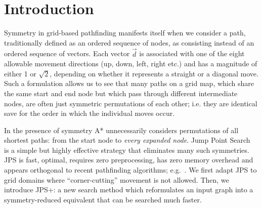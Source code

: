 \section{Introduction}
\label{sec:introduction}

Symmetry in grid-based pathfinding manifests itself when we consider a
path, traditionally defined as an ordered sequence of nodes, as consisting
instead of an ordered sequence of vectors.
Each vector $\vec{d}$ is associated with 
one of the eight allowable movement directions (up, down, left, right etc.)
and has a magnitude of either 1 or $\sqrt 2$, depending on whether 
it represents a straight or a diagonal move.
Such a formulation allows us to see that 
many paths on a grid map, which share the same start and end node but which pass through 
different intermediate nodes, are often just symmetric permutations of each other; i.e.
they are identical save for the order in which the individual moves occur.

In the presence of symmetry A* unnecessarily considers permutations 
of all shortest paths: from the start node to 
\emph{every expanded node}.
Jump Point Search~\cite{harabor11b} is a simple but highly effective strategy that
eliminates many such symmetries. 
JPS is fast, optimal, requires zero preprocessing, has zero memory overhead
and appears orthogonal to recent pathfinding algorithms; e.g.~\cite{bjornsson06,pochter09,goldenberg10}. 
We first adapt JPS to grid domains where ``corner-cutting'' movement is not allowed. 
Then, we introduce JPS+: a new search method which reformulates an input graph into a 
symmetry-reduced equivalent that can be 
searched much faster.
